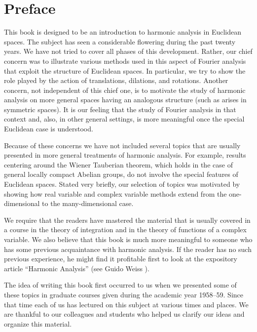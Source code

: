 \chapter*{Preface}

This book is designed to be an introduction to harmonic analysis in Euclidean
spaces. The subject has seen a considerable flowering during the past twenty
years. We have not tried to cover all phases of this development. Rather, our
chief concern was to illustrate various methods used in this aspect of Fourier
analysis that exploit the structure of Euclidean spaces. In particular, we try
to show the role played by the action of translations, dilations, and rotations.
Another concern, not independent of this chief one, is to motivate the study of
harmonic analysis on more general spaces having an analogous structure (such as
arises in symmetric spaces). It is our feeling that the study of Fourier
analysis in that context and, also, in other general settings, is more
meaningful once the special Euclidean case is understood.

Because of these concerns we have not included several topics that are usually
presented in more general treatments of harmonic analysis. For example, results
centering around the Wiener Tauberian theorem, which holds in the case of
general locally compact Abelian groups, do not involve the special features of
Euclidean spaces. Stated very briefly, our selection of topics was motivated by
showing how real variable and complex variable methods extend from the
one-dimensional to the many-dimensional case.

We require that the readers have mastered the material that is usually covered
in a course in the theory of integration and in the theory of functions of a
complex variable. We also believe that this book is much more meaningful to
someone who has some previous acquaintance with harmonic analysis. If the reader
has no such previous experience, he might find it profitable first to look at
the expository article ``Harmonic Analysis'' (see Guido Weiss \cite{Weiss3}).

The idea of writing this book first occurred to us when we presented some of
these topics in graduate courses given during the academic year 1958--59. Since
that time each of us has lectured on this subject at various times and places.
We are thankful to our colleagues and students who helped us clarify our ideas
and organize this material.

